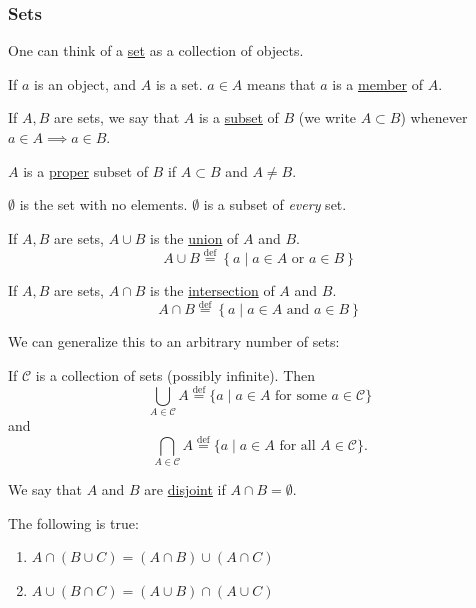 \subsubsection{Sets}
\begin{definition}[Set]
    One can think of a \ul{set} as a collection of objects.

    If $a$ is an object, and $A$ is a set. $a\in A$ means that $a$ is a \ul{member} of $A$.
\end{definition}
\begin{definition}[Subsets]
    If $A, B$ are sets, we say that $A$ is a \ul{subset} of $B$ (we write $A\subset B$) whenever $a\in A\implies a\in B$.

    $A$ is a \ul{proper} subset of $B$ if $A\subset B$ and $A\neq B$.
\end{definition}
\begin{remark}
    $\emptyset$ is the set with no elements. $\emptyset$ is a subset of \emph{every} set.
\end{remark}
\begin{definition}[Union]
    If $A, B$ are sets, $A\cup B$ is the \ul{union} of $A$ and $B$.
    \[A\cup B \overset{\text{def}}{=}\left\{ a\mid a\in A \text{ or }a\in B \right\}\]
\end{definition}
\begin{definition}[Intersection]
    If $A, B$ are sets, $A\cap B$ is the \ul{intersection} of $A$ and $B$.
    \[A\cap B \overset{\text{def}}{=}\left\{ a\mid a\in A \text{ and }a\in B \right\}\]
\end{definition}
We can generalize this to an arbitrary number of sets:
\begin{definition}
    If $\mathcal{C}$ is a collection of sets (possibly infinite). Then
    \[\bigcup_{A\in \mathcal{C}}A \overset{\text{def}}{=} \{a\mid a\in A \text{ for some }a\in \mathcal{C}\}\]
    and
    \[\bigcap_{A\in \mathcal{C}}A \overset{\text{def}}{=} \{a\mid a\in A \text{ for all }A\in \mathcal{C}\}.\]
\end{definition}
\begin{definition}[Disjunction]
    We say that $A$ and $B$ are \ul{disjoint} if $A\cap B = \emptyset$.
\end{definition}
\begin{proposition}
    The following is true:
    \begin{enumerate}
        \item $A\cap(B\cup C) = (A\cap B) \cup (A\cap C)$
        \item $A\cup(B\cap C) = (A\cup B) \cap (A\cup C)$
    \end{enumerate}
\end{proposition}
